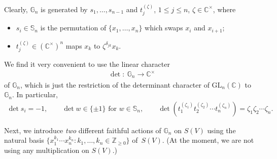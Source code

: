 Clearly, $\mathbb G_n$ is generated by $s_1,\ldots,s_{n-1}$ and $t_j^{(\zeta)}$, $1\le j\le n$, $\zeta\in \mathbb
C^\times$, where
\begin{itemize}\itemsep=0pt
\item
$s_i\in \mathbb S_n$ is the permutation of $\{x_1,\ldots,x_n\}$ which swaps $x_i$ and $x_{i+1}$;
\item
$t_j^{(\zeta)}\in (\mathbb C^\times)^n$ maps $x_k$ to $\zeta^{\delta_{jk}} x_k$.
\end{itemize}
We f\/ind it very convenient to use the linear character
\begin{gather*}
\det \colon \ \mathbb G_n \to \mathbb C^\times
\end{gather*}
of $\mathbb G_n$, which is just the restriction of the determinant character of $\mathrm{GL}_n(\mathbb C)$ to $\mathbb
G_n$.
In particular,
\begin{gather*}
\det s_i = -1,
\qquad
\det w\in\{\pm1\}\text{ for }w\in \mathbb S_n,
\qquad
\det\left(t_1^{(\zeta_1)} t_2^{(\zeta_2)} \cdots t_n^{(\zeta_n)}\right)=\zeta_1\zeta_2\cdots \zeta_n.
\end{gather*}

{\sloppy Next, we introduce \textit{two} dif\/ferent faithful actions of $\mathbb G_n$ on $S(V)$ using the natural basis
$\big\{x_1^{k_1} \cdots x_n^{k_n} :  k_1,\ldots,k_n\in \mathbb Z_{\ge0}\big\}$ of~$S(V)$.
(At the moment, we are not using any multiplication on $S(V)$.)

}

